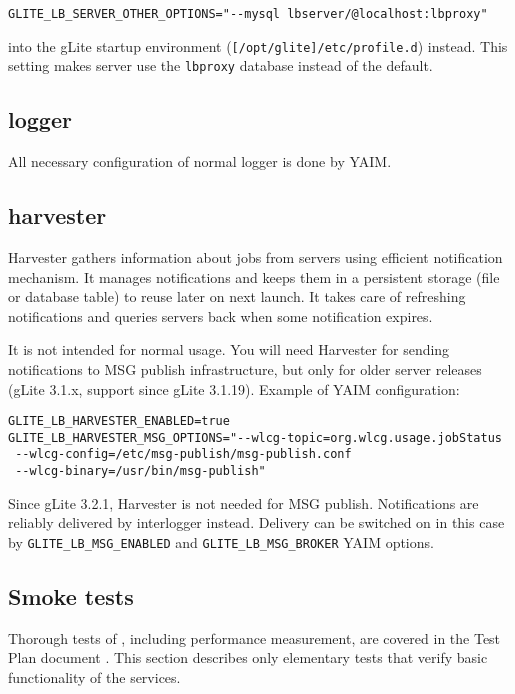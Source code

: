 \verb'GLITE_LB_SERVER_OTHER_OPTIONS="--mysql lbserver/@localhost:lbproxy"' 

into the gLite startup environment (\verb'[/opt/glite]/etc/profile.d') instead.
This setting makes \LB server use the \verb'lbproxy' database instead of the default.

\subsection{\LB logger}

All necessary configuration of normal \LB logger is done by YAIM.

\subsection{\LB harvester}

\LB Harvester gathers information about jobs from \LB servers using efficient
\LB notification mechanism. It manages notifications and keeps them in
a persistent storage (file or database table) to reuse later on next launch.
It takes care of refreshing notifications and queries \LB servers back when
some notification expires.

It is not intended for normal usage. You will need Harvester for sending notifications to MSG publish infrastructure, but only for older \LB server releases (gLite 3.1.x, support since gLite 3.1.19). Example of YAIM configuration:

\begin{verbatim}
GLITE_LB_HARVESTER_ENABLED=true
GLITE_LB_HARVESTER_MSG_OPTIONS="--wlcg-topic=org.wlcg.usage.jobStatus 
 --wlcg-config=/etc/msg-publish/msg-publish.conf 
 --wlcg-binary=/usr/bin/msg-publish"
\end{verbatim}

Since gLite 3.2.1, \LB Harvester is not needed for MSG publish. Notifications are reliably delivered by interlogger instead. Delivery can be switched on in this case by \texttt{GLITE\_LB\_MSG\_ENABLED} and \texttt{GLITE\_LB\_MSG\_BROKER} YAIM options.

\subsection{Smoke tests}

Thorough tests of \LB, including performance measurement, are
covered in the \LB Test Plan document \cite{lbtp}.
This section describes only elementary tests that verify basic
functionality of the services.

